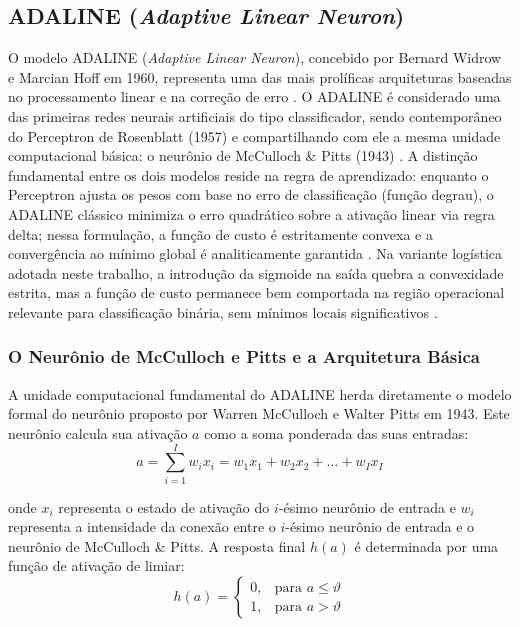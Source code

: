 \subsection{ADALINE (\textit{Adaptive Linear Neuron})}

O modelo ADALINE (\textit{Adaptive Linear Neuron}), concebido por Bernard Widrow e Marcian Hoff em 1960, representa uma das mais prolíficas arquiteturas baseadas no processamento linear e na correção de erro \cite{silva2016}. O ADALINE é considerado uma das primeiras redes neurais artificiais do tipo classificador, sendo contemporâneo do Perceptron de Rosenblatt (1957) e compartilhando com ele a mesma unidade computacional básica: o neurônio de McCulloch \& Pitts (1943) \cite{abdi2006}. A distinção fundamental entre os dois modelos reside na regra de aprendizado: enquanto o Perceptron ajusta os pesos com base no erro de classificação (função degrau), o ADALINE clássico minimiza o erro quadrático sobre a ativação linear via regra delta; nessa formulação, a função de custo é estritamente convexa e a convergência ao mínimo global é analiticamente garantida \cite{abdi2006}. Na variante logística adotada neste trabalho, a introdução da sigmoide na saída quebra a convexidade estrita, mas a função de custo permanece bem comportada na região operacional relevante para classificação binária, sem mínimos locais significativos \cite{braga2007}.

\subsubsection{O Neurônio de McCulloch e Pitts e a Arquitetura Básica}

A unidade computacional fundamental do ADALINE herda diretamente o modelo formal do neurônio proposto por Warren McCulloch e Walter Pitts em 1943. Este neurônio calcula sua ativação $a$ como a soma ponderada das suas entradas:
\begin{equation}
a = \sum_{i=1}^{I} w_i x_i = w_1 x_1 + w_2 x_2 + \ldots + w_I x_I
\end{equation}

onde $x_i$ representa o estado de ativação do $i$-ésimo neurônio de entrada e $w_i$ representa a intensidade da conexão entre o $i$-ésimo neurônio de entrada e o neurônio de McCulloch \& Pitts. A resposta final $h(a)$ é determinada por uma função de ativação de limiar:
\begin{equation}
h(a) = \begin{cases} 0, & \text{para } a \leq \vartheta \\ 1, & \text{para } a > \vartheta \end{cases}
\end{equation}

